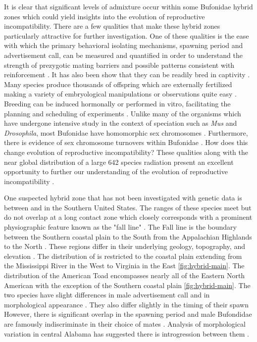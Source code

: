 It is clear that significant levels of admixture occur within some Bufonidae 
hybrid zones which could yield insights into the evolution of reproductive incompatibility. 
There are a few qualities that make these hybrid zones particularly attractive for further investigation.
One of these qualities is the ease with which the primary behavioral isolating mechanisms, 
spawning period and advertisement call, can be measured and quantified in order 
to understand the strength of prezygotic mating barriers and possible patterns 
consistent with reinforcement \parencite{cocroft1995,blair1974,kennedy1962}.
It has also been show that they can be readily bred in captivity \parencite{blair1972}. 
Many species produce thousands of offspring which are externally fertilized  
making a variety of embryological manipulations or observations quite easy \parencite{blair1972}.
Breeding can be induced hormonally or performed in vitro, facilitating the 
planning and scheduling of experiments \parencite{trudeau2010}.
Unlike many of the organisms which have undergone intensive study in the context 
of speciation such as \textit{Mus} and \textit{Drosophila}, most Bufonidae
have homomorphic sex chromosomes \parencite{blair1972}.  
Furthermore, there is evidence of sex chromosome turnovers within Bufonidae \parencite{defresnes2020,stock2011}. 
How does this change evolution of reproductive incompatibility?
These qualities along with the near global distribution of a large 642 species  
radiation present an excellent opportunity to further our understanding of the 
evolution of reproductive incompatibility \parencite{amphibiaweb2023} .

One suspected hybrid zone that has not been investigated with genetic data is 
between \amer and \terr in the Southern United States.
The ranges of these species meet but do not overlap at a long contact zone which
closely corresponds with a prominent physiographic feature known as the "fall line" \parencite{powel2016,mount1975}. 
The Fall line is the boundary between the Southern coastal plain to the South from 
the Appalachian Highlands to the North \parencite{shankman2007}.
These regions differ in their underlying geology, topography, and elevation \parencite{shankman2007}.
The distribution of \terr is restricted to the coastal plain extending from   
the Mississippi River in the West to Virginia in the East \cref{fig:hybrid-main}.
The distribution of the American Toad encompasses nearly all of the Eastern North 
American with the exception of the Southern coastal plain \cref{fig:hybrid-main}.
The two species have slight differences in male advertisement call and in 
morphological appearance \parencite{cocroft1995,weatherby1982}. 
They also differ slightly in the timing of their spawn \parencite{mount1975} 
However, there is significant overlap in the spawning period and male Bufondidae 
are famously indiscriminate in their choice of mates \parencite{dordevic2014,weatherby1982}.
Analysis of morphological variation in central Alabama has suggested there is 
introgression between them \parencite{weatherby1982}.

